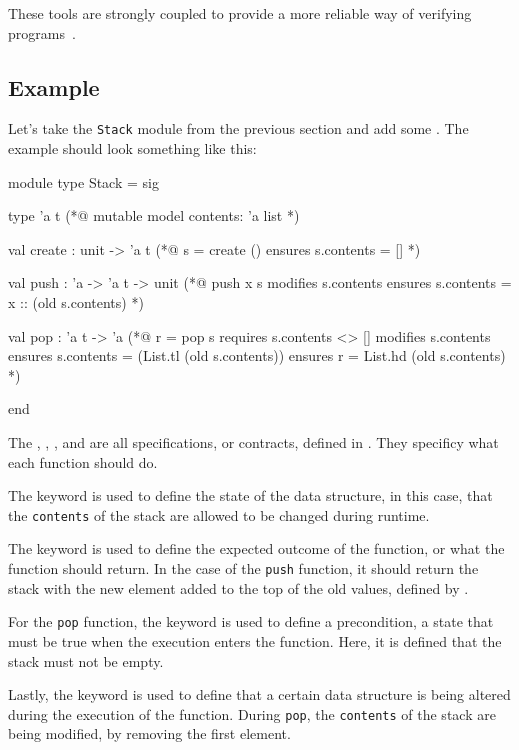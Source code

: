 These tools are strongly coupled to provide a more reliable way of verifying 
\ocaml programs~\cite{Pereira2024}.

\subsection{Example}
\label{sub:example}

Let's take the \texttt{Stack} module from the previous section and add some \gospellang. 
The example should look something like this:

\begin{gospel}
    module type Stack = sig

        type 'a t
        (*@ mutable model contents: 'a list *)

        val create : unit -> 'a t
        (*@ s = create ()
            ensures s.contents = [] *)

        val push : 'a -> 'a t -> unit
        (*@ push x s
            modifies s.contents
            ensures s.contents = x :: (old s.contents) *)

        val pop : 'a t -> 'a
        (*@ r = pop s
            requires s.contents <> []
            modifies s.contents
            ensures s.contents = (List.tl (old s.contents))
            ensures r = List.hd (old s.contents) *)

    end
\end{gospel}

The , , , and  are all specifications, 
or contracts, defined in \gospellang. They specificy what each function should do.

The  keyword is used to define the state of the data structure, in this case, 
that the \texttt{contents} of the stack are allowed to be changed during runtime.

The keyword  is used to define the expected outcome of the function, or what the function 
should return. In the case of the \texttt{push} function, it should return the stack with 
the new element added to the top of the old values, defined by .

For the \texttt{pop} function, the  keyword is used to define a precondition, 
a state that must be true when the execution enters the function. Here, it is defined that 
the stack must not be empty.

Lastly, the  keyword is used to define that a certain data structure is being 
altered during the execution of the function. During \texttt{pop}, the \texttt{contents} of 
the stack are being modified, by removing the first element.

